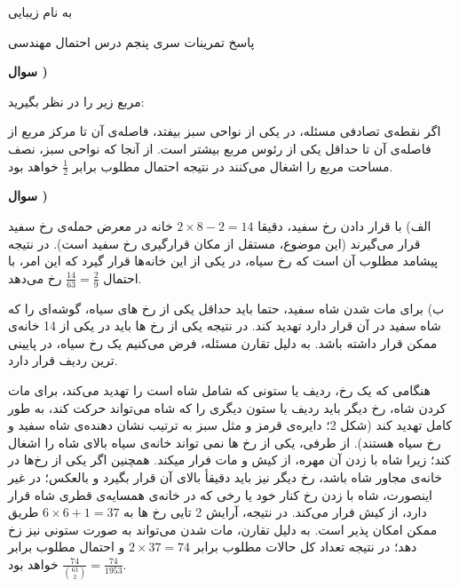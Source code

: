 \documentclass{article}
\newcounter{questionnumber}
\newcommand{\Q}{
\textbf{سوال \thequestionnumber)}
\stepcounter{questionnumber}
}
\begin{document}
\LARGE
\begin{center}

به نام زیبایی


پاسخ تمرینات سری پنجم درس احتمال مهندسی

\end{center}
\hrulefill
\large

\Q

مربع زیر را در نظر بگیرید:
\begin{figure}[h]
\centering
{}
\end{figure}
اگر نقطه‌ی تصادفی مسئله، در یکی از نواحی سبز بیفتد، فاصله‌ی آن تا مرکز مربع از فاصله‌ی آن تا حداقل یکی از رئوس مربع بیشتر است. از آنجا که نواحی سبز، نصف مساحت مربع را اشغال می‌کنند در نتیجه احتمال مطلوب برابر 
$
\frac{1}{2}
$
خواهد بود.


\Q

الف) با قرار دادن رخ سفید، دقیقا 
$
2\times 8-2=14
$
خانه در معرض حمله‌ی رخ سفید قرار می‌گیرند (این موضوع، مستقل از مکان قرارگیری رخ سفید است). در نتیجه پیشامد مطلوب آن است که رخ سیاه، در یکی از این خانه‌ها قرار گیرد که این امر، با احتمال 
$
\frac{14}{63}=\frac{2}{9}
$
رخ می‌دهد.

ب) برای مات شدن شاه سفید، حتما باید حداقل یکی از رخ های سیاه، گوشه‌ای را که شاه سفید در آن قرار دارد تهدید کند. در نتیجه یکی از رخ ها باید در یکی از 14 خانه‌ی ممکن قرار داشته باشد. به دلیل تقارن مسئله، فرض می‌کنیم یک رخ سیاه، در پایینی ترین ردیف قرار دارد.

هنگامی که یک رخ، ردیف یا ستونی که شامل شاه است را تهدید می‌کند، برای مات کردن شاه، رخ دیگر باید ردیف یا ستون دیگری را که شاه می‌تواند حرکت کند، به طور کامل تهدید کند (شکل 2؛ دایره‌ی قرمز و مثل سبز به ترتیب نشان دهنده‌ی شاه سفید و رخ سیاه هستند). از طرفی، یکی از رخ ها نمی تواند خانه‌ی سیاه بالای شاه را اشغال کند؛ زیرا شاه با زدن آن مهره، از کیش و مات فرار میکند. همچنین اگر یکی از رخ‌ها در خانه‌ی مجاور شاه باشد، رخ دیگر نیز باید دقیقأ بالای آن قرار بگیرد و بالعکس؛ در غیر اینصورت، شاه با زدن رخ کنار خود یا رخی که در خانه‌ی همسایه‌ی قطری شاه قرار دارد، از کیش فرار می‌کند. در نتیجه، آرایش 2 تایی رخ ها به 
$
6\times 6+1=37
$
طریق ممکن امکان پذیر است. به دلیل تقارن، مات شدن می‌تواند به صورت ستونی نیز زخ دهد؛ در نتیجه تعداد کل حالات مطلوب برابر 
$
2\times 37=74
$
و احتمال مطلوب برابر 
$
\frac{74}{\binom{63}{2}}=\frac{74}{1953}
$
خواهد بود.
\end{document}
